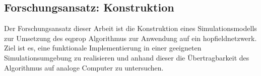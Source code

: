 \subsection{Forschungsansatz: Konstruktion}

Der Forschungsansatz dieser Arbeit ist die Konstruktion eines Simulationsmodells zur Umsetzung des \gls{eqprop} Algorithmus zur Anwendung auf ein \gls{hopfieldnetzwerk}. Ziel ist es, eine funktionale Implementierung in einer geeigneten Simulationsumgebung zu realisieren und anhand dieser die Übertragbarkeit des Algorithmus auf analoge Computer zu untersuchen.
